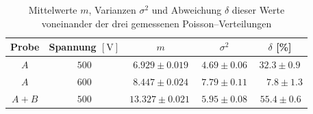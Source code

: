 \documentclass[12pt,a4paper]{scrartcl}
\numberwithin{equation}{section} %
\begin{document}
\begin{table}[h!]
	\centering
	\begin{tabular}{c|c|c|c|c}
		Probe & Spannung $[\mathrm{V}]$ & $m$ & $\sigma^2$ & $\delta$ [\%]\\
		\hline
		$A$ & $500$ & $6.929 \pm 0.019$ & $4.69 \pm 0.06$ & $32.3 \pm 0.9$ \\
		$A$ & $600$ & $8.447 \pm 0.024$ & $7.79 \pm 0.11$ & \ \ $7.8 \pm 1.3 $ \\
		$A+B$ & $500$ & $13.327 \pm 0.021\ $ & $5.95 \pm 0.08$ & \,$55.4 \pm 0.6 $ \\
	\end{tabular}
	\caption{Mittelwerte $m$, Varianzen $\sigma^2$ und Abweichung $\delta$ dieser Werte voneinander der drei gemessenen Poisson--Verteilungen}
	\label{table:poisson}
\end{table}
\end{document}
